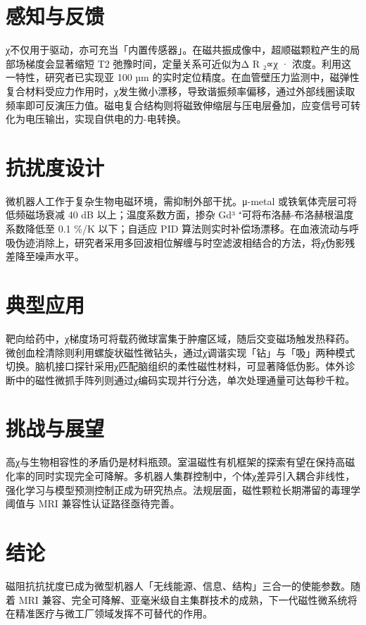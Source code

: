 \chapter{感知与反馈}
χ不仅用于驱动，亦可充当「内置传感器」。在磁共振成像中，超顺磁颗粒产生的局部场梯度会显著缩短 T2 弛豫时间，定量关系可近似为Δ R ₂∝χ · 浓度。利用这一特性，研究者已实现亚 100 µm 的实时定位精度。在血管壁压力监测中，磁弹性复合材料受应力作用时，χ发生微小漂移，导致谐振频率偏移，通过外部线圈读取频率即可反演压力值。磁电复合结构则将磁致伸缩层与压电层叠加，应变信号可转化为电压输出，实现自供电的力-电转换。\par
\chapter{抗扰度设计}
微机器人工作于复杂生物电磁环境，需抑制外部干扰。μ-metal 或铁氧体壳层可将低频磁场衰减 40 dB 以上；温度系数方面，掺杂 Gd³ ⁺可将布洛赫-布洛赫根温度系数降低至 0.1 \%{}/K 以下；自适应 PID 算法则实时补偿场漂移。在血液流动与呼吸伪迹消除上，研究者采用多回波相位解缠与时空滤波相结合的方法，将χ伪影残差降至噪声水平。\par
\chapter{典型应用}
靶向给药中，χ梯度场可将载药微球富集于肿瘤区域，随后交变磁场触发热释药。微创血栓清除则利用螺旋状磁性微钻头，通过χ调谐实现「钻」与「吸」两种模式切换。脑机接口探针采用χ匹配脑组织的柔性磁性材料，可显著降低伪影。体外诊断中的磁性微抓手阵列则通过χ编码实现并行分选，单次处理通量可达每秒千粒。\par
\chapter{挑战与展望}
高χ与生物相容性的矛盾仍是材料瓶颈。室温磁性有机框架的探索有望在保持高磁化率的同时实现完全可降解。多机器人集群控制中，个体χ差异引入耦合非线性，强化学习与模型预测控制正成为研究热点。法规层面，磁性颗粒长期滞留的毒理学阈值与 MRI 兼容性认证路径亟待完善。\par
\chapter{结论}
磁阻抗抗扰度已成为微型机器人「无线能源、信息、结构」三合一的使能参数。随着 MRI 兼容、完全可降解、亚毫米级自主集群技术的成熟，下一代磁性微系统将在精准医疗与微工厂领域发挥不可替代的作用。\par
